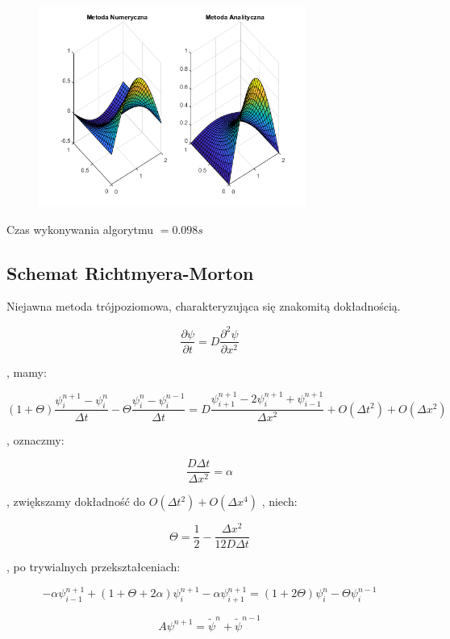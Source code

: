 \begin{figure}[!ht]
	\begin{center}
		\includegraphics[width=0.78\textwidth]{Lab7/charts/df/30_2_k.png}
	\end{center}
\end{figure}

Czas wykonywania algorytmu $ = 0.098 s$

\newpage
\subsection{Schemat Richtmyera-Morton}

Niejawna metoda trójpoziomowa, charakteryzująca się znakomitą dokładnością.

$$\dfrac{\partial \psi}{\partial t} = D\dfrac{\partial^2 \psi}{\partial x^2}$$

, mamy:

$$(1+\Theta)\dfrac{\psi^{n+1}_{i}-\psi^n_{i}}{\Delta t}-\Theta\dfrac{\psi^{n}_{i}-\psi^{n-1}_{i}}{\Delta t} = D \dfrac{\psi^{n+1}_{i+1}-2\psi^{n+1}_{i}+\psi^{n+1}_{i-1}}{\Delta x^2} + O(\Delta t^2) + O(\Delta x^2) $$

, oznaczmy:

$$\dfrac{D\Delta t}{\Delta x^2} = \alpha$$

, zwiększamy dokładność do  $O(\Delta t^2) + O(\Delta x^4)$ , niech:

$$\Theta = \frac{1}{2} - \dfrac{\Delta x^2}{12D\Delta t}$$

, po trywialnych przekształceniach:

$$-\alpha\psi^{n+1}_{i-1}+(1+\Theta + 2\alpha)\psi^{n+1}_{i}-\alpha\psi^{n+1}_{i+1}=(1+2\Theta)\psi^{n}_{i} - \Theta\psi^{n-1}_{i}$$

$$A\psi^{n+1}=\widetilde{\psi}^{n}+\widetilde{\psi}^{n-1}$$


